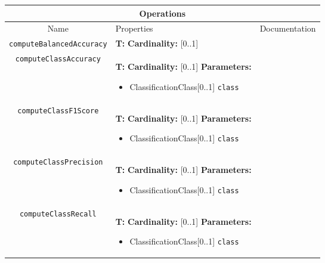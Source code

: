 \documentclass{article}
\begin{document}
\begin{table}[H]
\footnotesize
\begin{tabularx}{\textwidth}{|c| p{4 cm} | X |}
\hline
\multicolumn{3}{|c|}{\textbf{Operations}} \\
\hline
Name & Properties & Documentation \\ \hline \hline
\texttt{computeBalancedAccuracy}
 & 
\textbf{T:} \texttt{}
\newline
\textbf{Cardinality:} [0..1]
 & \\ \hline
\texttt{computeClassAccuracy}
 & 
\textbf{T:} \texttt{}
\newline
\textbf{Cardinality:} [0..1]
\newline
\textbf{Parameters:}
\begin{itemize}
\item ClassificationClass[0..1] \texttt{class}
\end{itemize}
 & \\ \hline
\texttt{computeClassF1Score}
 & 
\textbf{T:} \texttt{}
\newline
\textbf{Cardinality:} [0..1]
\newline
\textbf{Parameters:}
\begin{itemize}
\item ClassificationClass[0..1] \texttt{class}
\end{itemize}
 & \\ \hline
\texttt{computeClassPrecision}
 & 
\textbf{T:} \texttt{}
\newline
\textbf{Cardinality:} [0..1]
\newline
\textbf{Parameters:}
\begin{itemize}
\item ClassificationClass[0..1] \texttt{class}
\end{itemize}
 & \\ \hline
\texttt{computeClassRecall}
 & 
\textbf{T:} \texttt{}
\newline
\textbf{Cardinality:} [0..1]
\newline
\textbf{Parameters:}
\begin{itemize}
\item ClassificationClass[0..1] \texttt{class}

\end{itemize}
\end{tabularx}
\end{table}
\end{document}

